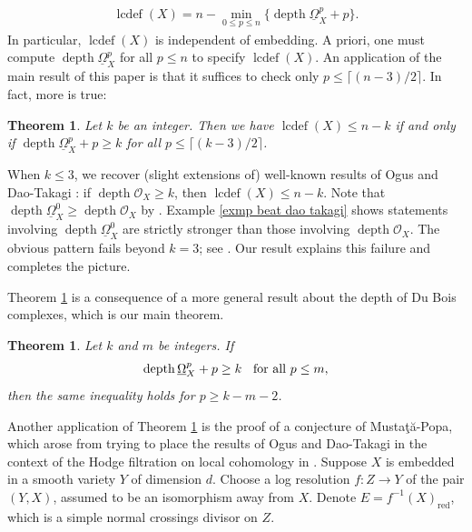 \documentclass[11pt]{amsart}
\theoremstyle{definition}
\theoremstyle{plain}
\newcounter{intro}
\newtheorem{intro-theorem}[intro]{Theorem}
\DeclareMathOperator{\lcdef}{lcdef}
\DeclareMathOperator{\depth}{depth}
\DeclareMathOperator{\red}{red}
\begin{document}
\begin{align}\label{intro lcdef depth}
    \lcdef(X) = n - \min_{0 \leq p \leq n} \{ \depth \underline{\Omega}_X^p + p \}.
\end{align}
In particular, $\lcdef(X)$ is independent of embedding. A priori, one must compute $\depth \underline{\Omega}_X^p$ for all $p \leq n$ to specify $\lcdef(X)$. An application of the main result of this paper is that it suffices to check only $p \leq \lceil (n-3)/2 \rceil$. In fact, more is true:

\begin{intro-theorem}\label{intro thm easy}
Let $k$ be an integer. Then we have $\lcdef (X) \leq n-k$ if and only if 
$\depth \underline{\Omega}_X^p + p \geq k$ for all $p \leq \lceil (k-3)/2 \rceil$.
\end{intro-theorem}

When $k \leq 3$, we recover (slight extensions of) well-known results of Ogus \cite{ogus} and Dao-Takagi \cite{dao takagi}: if $\depth \mathscr{O}_X \geq k$, then $\lcdef(X) \leq n-k$. Note that $\depth \underline{\Omega}_X^0 \geq \depth \mathscr{O}_X$ by \cite{kovacs schwede}. Example \ref{exmp beat dao takagi} shows statements involving $\depth \underline{\Omega}_X^0$ are strictly stronger than those involving $\depth \mathscr{O}_X$. The obvious pattern fails beyond $k = 3$; see \cite[Example $2.11$]{dao takagi}. Our result explains this failure and completes the picture.

Theorem \ref{intro thm easy} is a consequence of a more general result about the depth of Du Bois complexes, which is our main theorem.

\begin{intro-theorem}\label{intro thm main}
Let $k$ and $m$ be integers. If
\begin{align*}
    \depth \underline{\Omega}_X^p + p \geq k \hspace{.2cm} \text{ for all } p \leq m,
\end{align*}
then the same inequality holds for $p \geq k-m-2$.
\end{intro-theorem}

Another application of Theorem \ref{intro thm main} is the proof of a conjecture of Musta{\c{t}}{\u{a}}-Popa, which arose from trying to place the results of Ogus and Dao-Takagi in the context of the Hodge filtration on local cohomology in \cite{local cohomology}. Suppose $X$ is embedded in a smooth variety $Y$ of dimension $d$. Choose a log resolution $f:Z \rightarrow Y$ of the pair $(Y, X)$, assumed to be an isomorphism away from $X$. Denote $E = f^{-1}(X)_{\red}$, which is a simple normal crossings divisor on $Z$.
\end{document}
